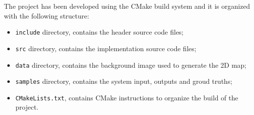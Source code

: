 The project has been developed using the CMake build system and it is organized with the
following structure:
\begin{itemize}
    \item \verb|include| directory, contains the header source code files;
    \item \verb|src| directory, contains the implementation source code files;
    \item \verb|data| directory, contains the background image used to generate the 2D map;
    \item \verb|samples| directory, contains the system input, outputs and groud truths;
    \item \verb|CMakeLists.txt|, contains CMake instructions to organize the build of the project. 
\end{itemize}